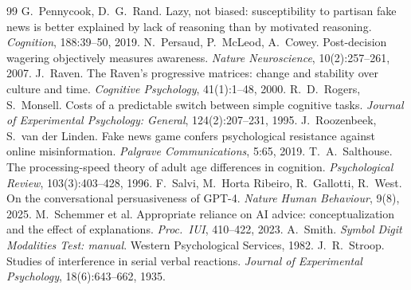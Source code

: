 \documentclass[11pt,a4paper]{article}
\begin{document}
\begin{thebibliography}{99}
 G.~Pennycook, D.~G.~Rand. Lazy, not biased: susceptibility to partisan fake news is better explained by lack of reasoning than by motivated reasoning. \emph{Cognition}, 188:39--50, 2019.
 N.~Persaud, P.~McLeod, A.~Cowey. Post-decision wagering objectively measures awareness. \emph{Nature Neuroscience}, 10(2):257--261, 2007.
 J.~Raven. The Raven's progressive matrices: change and stability over culture and time. \emph{Cognitive Psychology}, 41(1):1--48, 2000.
 R.~D.~Rogers, S.~Monsell. Costs of a predictable switch between simple cognitive tasks. \emph{Journal of Experimental Psychology: General}, 124(2):207--231, 1995.
 J.~Roozenbeek, S.~van der Linden. Fake news game confers psychological resistance against online misinformation. \emph{Palgrave Communications}, 5:65, 2019.
 T.~A.~Salthouse. The processing-speed theory of adult age differences in cognition. \emph{Psychological Review}, 103(3):403--428, 1996.
 F.~Salvi, M.~Horta Ribeiro, R.~Gallotti, R.~West. On the conversational persuasiveness of GPT-4. \emph{Nature Human Behaviour}, 9(8), 2025.
 M.~Schemmer et al. Appropriate reliance on AI advice: conceptualization and the effect of explanations. \emph{Proc.\ IUI}, 410--422, 2023.
 A.~Smith. \emph{Symbol Digit Modalities Test: manual}. Western Psychological Services, 1982.
 J.~R.~Stroop. Studies of interference in serial verbal reactions. \emph{Journal of Experimental Psychology}, 18(6):643--662, 1935.
\end{thebibliography}
\end{document}
